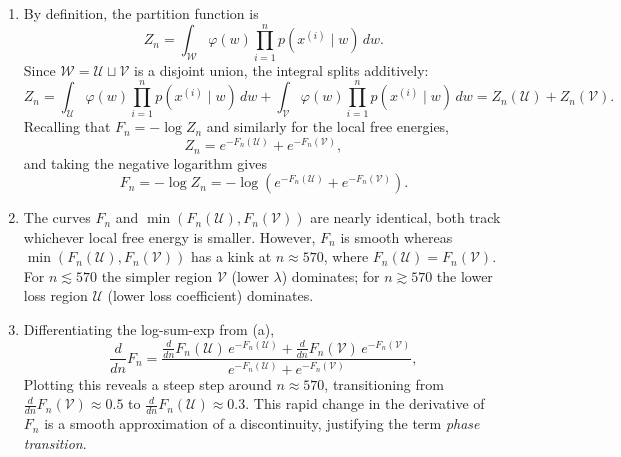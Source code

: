 \documentclass[11pt]{article}
\newcommand{\W}{\mathcal{W}}
\newcommand{\U}{\mathcal{U}}
\newcommand{\V}{\mathcal{V}}
\begin{document}
\begin{solution}
\begin{enumerate}
    \item
        By definition, the partition function is
        \begin{equation*}
            Z_n = \int_\W \varphi(w) \prod_{i=1}^n p(x^{(i)} \mid w)\, dw.
        \end{equation*}
        Since $\W = \U \sqcup \V$ is a disjoint union, the integral splits additively:
        \begin{equation*}
            Z_n = \int_\U \varphi(w) \prod_{i=1}^n p(x^{(i)} \mid w)\, dw
                + \int_\V \varphi(w) \prod_{i=1}^n p(x^{(i)} \mid w)\, dw
                = Z_n(\U) + Z_n(\V).
        \end{equation*}
        Recalling that $F_n = -\log Z_n$ and similarly for the local free energies,
        \begin{equation*}
            Z_n = e^{-F_n(\U)} + e^{-F_n(\V)},
        \end{equation*}
        and taking the negative logarithm gives
        \begin{equation*}
            F_n = -\log Z_n = -\log(e^{-F_n(\U)} + e^{-F_n(\V)}).
        \end{equation*}

    \item
        The curves $F_n$ and $\min(F_n(\U), F_n(\V))$ are nearly
        identical, both track whichever local free energy is smaller.
        However, $F_n$ is smooth whereas $\min(F_n(\U), F_n(\V))$ has a
        kink at $n \approx 570$, where $F_n(\U) = F_n(\V)$.
        For $n \lesssim 570$ the simpler region $\V$ (lower $\lambda$)
        dominates; for $n \gtrsim 570$ the lower loss region $\U$
        (lower loss coefficient) dominates.

    \item
        Differentiating the log-sum-exp from (a),
        \begin{equation*}
            \frac{d}{dn}F_n
            = \frac{\frac{d}{dn}F_n(\U)\,e^{-F_n(\U)} + \frac{d}{dn}F_n(\V)\,e^{-F_n(\V)}}
                   {e^{-F_n(\U)} + e^{-F_n(\V)}},
        \end{equation*}
        Plotting this reveals a steep step around
        $n \approx 570$, transitioning from $\frac{d}{dn}F_n(\V) \approx 0.5$ to
        $\frac{d}{dn}F_n(\U) \approx 0.3$. This rapid change in the derivative of
        $F_n$ is a smooth approximation of a discontinuity, justifying
        the term \emph{phase transition}.


\end{enumerate}
\end{solution}
\end{document}

